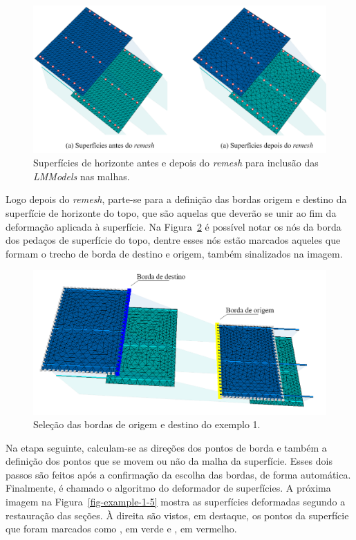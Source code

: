 \begin{figure} [H]
  \begin{center}
    \includegraphics[width=\textwidth]{images/fig-example-1-3}
    \caption{Superfícies de horizonte antes e depois do \textit{remesh} para inclusão das \textit{LMModels} nas malhas.}\label{fig-example-1-3}
  \end{center}
\end{figure}

Logo depois do \textit{remesh}, parte-se para a definição das bordas origem e destino da superfície de horizonte do topo, que são aquelas que deverão se unir ao fim da deformação aplicada à superfície. Na Figura~\ref{fig-example-1-4} é possível notar os nós da borda dos pedaços de superfície do topo, dentre esses nós estão marcados aqueles que formam o trecho de borda de destino e origem, também sinalizados na imagem.

\begin{figure} [H]
  \begin{center}
    \includegraphics[width=350pt]{images/fig-example-1-4}
    \caption{Seleção das bordas de origem e destino do exemplo 1.}\label{fig-example-1-4}
  \end{center}
\end{figure}

Na etapa seguinte, calculam-se as direções dos pontos de borda e também a definição dos pontos que se movem ou não da malha da superfície. Esses dois passos são feitos após a confirmação da escolha das bordas, de forma automática. Finalmente, é chamado o algoritmo do deformador de superfícies. A próxima imagem na Figura~\ref{fig-example-1-5} mostra as superfícies deformadas segundo a restauração das seções. À direita são vistos, em destaque, os pontos da superfície que foram marcados como , em verde e , em vermelho.

